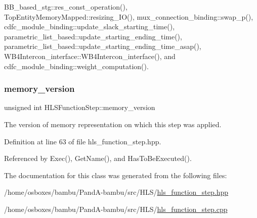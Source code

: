 B\+B\+\_\+based\+\_\+stg\+::res\+\_\+const\+\_\+operation(), Top\+Entity\+Memory\+Mapped\+::resizing\+\_\+\+I\+O(), mux\+\_\+connection\+\_\+binding\+::swap\+\_\+p(), cdfc\+\_\+module\+\_\+binding\+::update\+\_\+slack\+\_\+starting\+\_\+time(), parametric\+\_\+list\+\_\+based\+::update\+\_\+starting\+\_\+ending\+\_\+time(), parametric\+\_\+list\+\_\+based\+::update\+\_\+starting\+\_\+ending\+\_\+time\+\_\+asap(), W\+B4\+Intercon\+\_\+interface\+::\+W\+B4\+Intercon\+\_\+interface(), and cdfc\+\_\+module\+\_\+binding\+::weight\+\_\+computation().

\mbox{\label{classHLSFunctionStep_a92a997a658503109e3b21c877aa376d8}} 
\subsubsection{\texorpdfstring{memory\+\_\+version}{memory\_version}}
{\footnotesize\ttfamily unsigned int H\+L\+S\+Function\+Step\+::memory\+\_\+version\hspace{0.3cm}{\ttfamily [protected]}}



The version of memory representation on which this step was applied. 



Definition at line 63 of file hls\+\_\+function\+\_\+step.\+hpp.



Referenced by Exec(), Get\+Name(), and Has\+To\+Be\+Executed().



The documentation for this class was generated from the following files\+:\begin{DoxyCompactItemize}
\item 
/home/osboxes/bambu/\+Pand\+A-\/bambu/src/\+H\+L\+S/\hyperlink{hls__function__step_8hpp}{hls\+\_\+function\+\_\+step.\+hpp}\item 
/home/osboxes/bambu/\+Pand\+A-\/bambu/src/\+H\+L\+S/\hyperlink{hls__function__step_8cpp}{hls\+\_\+function\+\_\+step.\+cpp}\end{DoxyCompactItemize}
